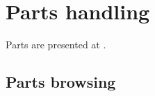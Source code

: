 
\chapter{Parts handling}\label{Parts handling}

Parts are presented at .


\section{Parts browsing}\label{Parts browsing}

